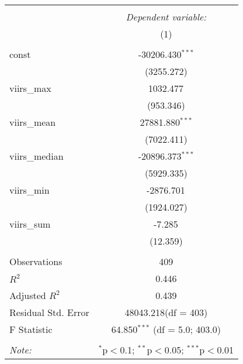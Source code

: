 \begin{table}[!htbp] \centering
\begin{tabular}{@{\extracolsep{5pt}}lc}
\\[-1.8ex]\hline
\hline \\[-1.8ex]
& \multicolumn{1}{c}{\textit{Dependent variable:}} \
\cr \cline{1-2}
\\[-1.8ex] & (1) \\
\hline \\[-1.8ex]
 const & -30206.430$^{***}$ \\
  & (3255.272) \\
 viirs_max & 1032.477$^{}$ \\
  & (953.346) \\
 viirs_mean & 27881.880$^{***}$ \\
  & (7022.411) \\
 viirs_median & -20896.373$^{***}$ \\
  & (5929.335) \\
 viirs_min & -2876.701$^{}$ \\
  & (1924.027) \\
 viirs_sum & -7.285$^{}$ \\
  & (12.359) \\
\hline \\[-1.8ex]
 Observations & 409 \\
 $R^2$ & 0.446 \\
 Adjusted $R^2$ & 0.439 \\
 Residual Std. Error & 48043.218(df = 403)  \\
 F Statistic & 64.850$^{***}$ (df = 5.0; 403.0) \\
\hline
\hline \\[-1.8ex]
\textit{Note:} & \multicolumn{1}{r}{$^{*}$p$<$0.1; $^{**}$p$<$0.05; $^{***}$p$<$0.01} \\
\end{tabular}
\end{table}